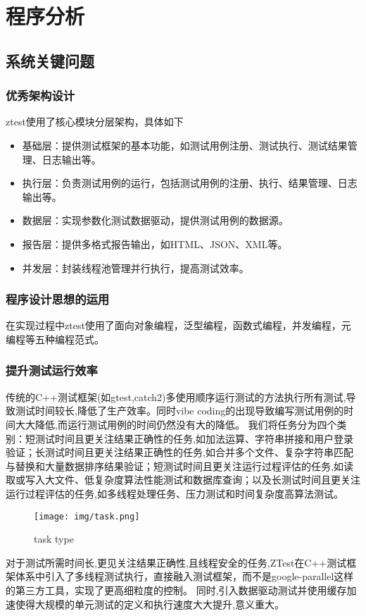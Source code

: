 \documentclass{article}
\begin{document}
\section{程序分析}
\subsection{ 系统关键问题}
\subsubsection{优秀架构设计}
ztest使用了核心模块分层架构，具体如下
\begin{itemize}
    \item 基础层：提供测试框架的基本功能，如测试用例注册、测试执行、测试结果管理、日志输出等。
    \item 执行层：负责测试用例的运行，包括测试用例的注册、执行、结果管理、日志输出等。
    \item 数据层：实现参数化测试数据驱动，提供测试用例的数据源。
    \item 报告层：提供多格式报告输出，如HTML、JSON、XML等。
    \item 并发层：封装线程池管理并行执行，提高测试效率。
\end{itemize}
\subsubsection{程序设计思想的运用}
在实现过程中ztest使用了面向对象编程，泛型编程，函数式编程，并发编程，元编程等五种编程范式。

\subsubsection{提升测试运行效率}
传统的C++测试框架(如gtest,catch2)多使用顺序运行测试的方法执行所有测试,导致测试时间较长,降低了生产效率。同时vibe coding的出现导致编写测试用例的时间大大降低,而运行测试用例的时间仍然没有大的降低。
我们将任务分为四个类别：短测试时间且更关注结果正确性的任务,如加法运算、字符串拼接和用户登录验证；长测试时间且更关注结果正确性的任务,如合并多个文件、复杂字符串匹配与替换和大量数据排序结果验证；短测试时间且更关注运行过程评估的任务,如读取或写入大文件、低复杂度算法性能测试和数据库查询；以及长测试时间且更关注运行过程评估的任务,如多线程处理任务、压力测试和时间复杂度高算法测试。
\begin{figure}[H]
    \centering
    \texttt{[image: img/task.png]} %
    \caption{ task type}
    \label{fig:task types }
\end{figure}
对于测试所需时间长,更见关注结果正确性,且线程安全的任务,ZTest在C++测试框架体系中引入了多线程测试执行，直接融入测试框架，而不是google-parallel这样的第三方工具，实现了更高细粒度的控制。
同时,引入数据驱动测试并使用缓存加速使得大规模的单元测试的定义和执行速度大大提升,意义重大。
\end{document}
